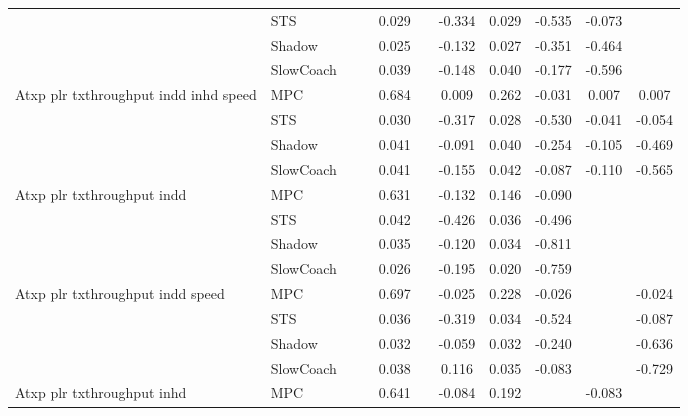 \begin{tabular}{|l|l|*{9}{c|}}
                              & STS &       &        &     0.029 &     & -0.334 &  0.029 &  -0.535 &  -0.073 &       \\
                              & Shadow &       &        &     0.025 &     & -0.132 &  0.027 &  -0.351 &  -0.464 &       \\
                              & SlowCoach &       &        &     0.039 &     & -0.148 &  0.040 &  -0.177 &  -0.596 &       \\
\midrule
Atxp plr txthroughput indd inhd speed    & MPC &       &        &     0.684 &     &  0.009 &  0.262 &  -0.031 &   0.007 &    0.007 \\
                              & STS &       &        &     0.030 &     & -0.317 &  0.028 &  -0.530 &  -0.041 &   -0.054 \\
                              & Shadow &       &        &     0.041 &     & -0.091 &  0.040 &  -0.254 &  -0.105 &   -0.469 \\
                              & SlowCoach &       &        &     0.041 &     & -0.155 &  0.042 &  -0.087 &  -0.110 &   -0.565 \\
\midrule
Atxp plr txthroughput indd    & MPC &       &        &     0.631 &     & -0.132 &  0.146 &  -0.090 &      &       \\
                              & STS &       &        &     0.042 &     & -0.426 &  0.036 &  -0.496 &      &       \\
                              & Shadow &       &        &     0.035 &     & -0.120 &  0.034 &  -0.811 &      &       \\
                              & SlowCoach &       &        &     0.026 &     & -0.195 &  0.020 &  -0.759 &      &       \\
\midrule
Atxp plr txthroughput indd speed    & MPC &       &        &     0.697 &     & -0.025 &  0.228 &  -0.026 &      &   -0.024 \\
                              & STS &       &        &     0.036 &     & -0.319 &  0.034 &  -0.524 &      &   -0.087 \\
                              & Shadow &       &        &     0.032 &     & -0.059 &  0.032 &  -0.240 &      &   -0.636 \\
                              & SlowCoach &       &        &     0.038 &     &  0.116 &  0.035 &  -0.083 &      &   -0.729 \\
\midrule
Atxp plr txthroughput inhd    & MPC &       &        &     0.641 &     & -0.084 &  0.192 &      &  -0.083 &       \\

\end{tabular}
